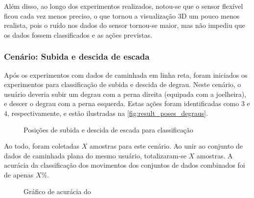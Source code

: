 

Além disso, ao longo dos experimentos realizados, notou-se que o sensor flexível ficou cada vez menos preciso, o que tornou a visualização 3D um pouco menos realista, pois o ruído nos dados do sensor tornou-se maior, mas não impediu que os dados fossem classificados e as ações previstas.


\subsubsection{Cenário: Subida e descida de escada}
Após os experimentos com dados de caminhada em linha reta, foram iniciados os experimentos para classificação de subida e descida de degrau. Neste cenário, o usuário deveria subir um degrau com a perna direita (equipada com a joelheira), e descer o degrau com a perna esquerda. Estas ações foram identificadas como \(3\) e \(4\), respectivamente, e estão ilustradas na \autoref{fig:result_poses_degraus}.

\begin{figure}[ht]
	\caption{\label{fig:result_poses_degraus}Posições de subida e descida de escada para classificação}
	\begin{center}
	\end{center}
\end{figure}

Ao todo, foram coletadas \(X\) amostras para este cenário. Ao unir ao conjunto de dados de caminhada plana do mesmo usuário, totalizaram-se \(X\) amostras. A acurácia da classificação dos movimentos dos conjuntos de dados combinados foi de apenas \(X\%\).

\begin{figure}[ht]
	\caption{\label{fig:result_accuracy_degraus_1}Gráfico de acurácia do}
	\begin{center}
	\end{center}
\end{figure}

